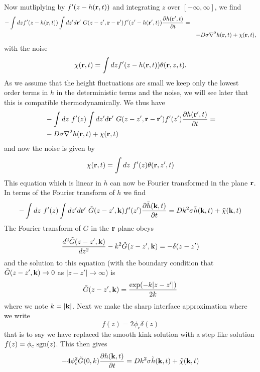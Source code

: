 Now mutliplying by $f'(z-h({\bf r},t))$ and integrating $z$ over $[-\infty,\infty]$, we find
\begin{align}
-\int dz f'(z-h({\bf r},t))\int dz'd{\bf r}'\  G(z-z',{\bf r}-{\bf r}') f'(z'-h({\bf r}',t))\frac{\partial h({\bf r}',t)}{\partial t} = \\
&&-D\sigma \nabla^2 h({\bf r},t) + \chi({\bf r},t),
\end{align}
with the noise
\begin{equation}
    \chi({\bf r},t)= \int dz f'(z-h({\bf r},t)) \theta({\bf r},z,t).
\end{equation}
As we assume that the height fluctuations are small we keep only the lowest order terms in $h$ in the deterministic terms and the noise, we will see later that this is compatible thermodynamically. We thus have
\begin{eqnarray}
&-\int dz \ f'(z)\int dz'd{\bf r}'\  G(z-z',{\bf r}-{\bf r}') f'(z')\frac{\partial h({\bf r}',t)}{\partial t} = \nonumber \\
&-D\sigma \nabla^2 h({\bf r},t) + \chi({\bf r},t)
\end{eqnarray}
and now  the noise is given by
\begin{equation}
    \chi({\bf r},t)= \int dz\  f'(z) \theta({\bf r},z',t)
\end{equation}
This equation which is linear in $h$ can now be Fourier transformed in the plane ${\bf r}$. In terms of the Fourier transform of $h$ we find
\begin{equation}
    -\int dz \ f'(z)\int dz'd\br'\ \tilde G(z-z',\bk) f'(z')\frac{\partial\tilde h(\bk,t)}{\partial t} = Dk^2\sigma \tilde h(\bk,t) + \tilde \chi(\bk,t)
    \label{bstep}
\end{equation}
The Fourier transform of $G$ in the ${\bf r}$ plane obeys
\begin{equation}
    \frac{d^2 \tilde G(z-z',{\bf k} )}{dz^2}-k^2 \tilde G(z-z',{\bf k} )=-\delta(z-z')
\end{equation}
and the solution to this equation (with the boundary condition that $\tilde G(z-z',{\bf k} )\to 0$ as $|z-z'|\to\infty$)  is
\begin{equation}
    \tilde G(z-z',{\bf k}) = \frac{\exp(-k|z-z'|)}{2k}
\end{equation}
where we note $k=|{\bf k}|$. Next we make the sharp interface approximation where we write
\begin{equation}
    f(z) = 2\phi_c \delta(z)
    \label{sharp}
\end{equation}
that is to say we have replaced the smooth kink solution with a step like solution
$f(z) = \phi_c\  {\rm sgn}(z)$. This then gives
\begin{equation}
    -4\phi_c^2 \tilde G(0,k) \frac{\partial h({\bf k},t)}{\partial t} = Dk^2\sigma  \tilde h({\bf k},t) + \tilde \chi({\bf k},t)
\end{equation}
